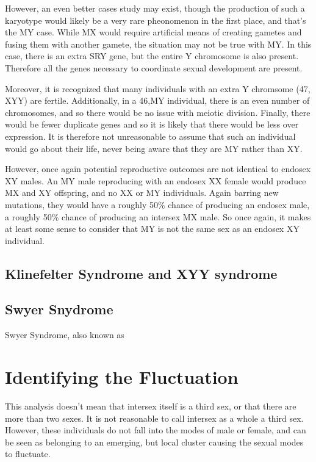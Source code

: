 \documentclass{article}
\begin{document}
However, an even better cases study may exist, though the production of such a karyotype would likely be a very rare pheonomenon in the first place, and that's the MY case. While MX would require artificial means of creating gametes and fusing them with another gamete, the situation may not be true with MY. In this case, there is an extra SRY gene, but the entire Y chromosome is also present. Therefore all the genes necessary to coordinate sexual development are present. 

Moreover, it is recognized that many individuals with an extra Y chromsome (47, XYY) are fertile\cite{BorjianBoroujeni2017}. Additionally, in a 46,MY individual, there is an even number of chromosomes, and so there would be no issue with meiotic division. Finally, there would be fewer duplicate genes and so it is likely that there would be less over expression. It is therefore not unreasonable to assume that such an individual would go about their life, never being aware that they are MY rather than XY.

However, once again potential reproductive outcomes are not identical to endosex XY males. An MY male reproducing with an endosex XX female would produce MX and XY offspring, and no XX or MY individuals. Again barring new mutations, they would have a roughly 50\% chance of producing an endosex male, a roughly 50\% chance of producing an intersex MX male. So once again, it makes at least some sense to consider that MY is not the same sex as an endosex XY individual. 

\subsection{Klinefelter Syndrome and XYY syndrome}
\subsection{Swyer Snydrome}
Swyer Syndrome, also known as \cite{Dumic2008}

\section{Identifying the Fluctuation}
This analysis doesn't mean that intersex itself is a third sex, or that there are more than two sexes. It is not reasonable to call intersex as a whole a third sex\cite{Carpenter2018}. However, these individuals do not fall into the modes of male or female, and can be seen as belonging to an emerging, but local cluster causing the sexual modes to fluctuate. 
\end{document}
